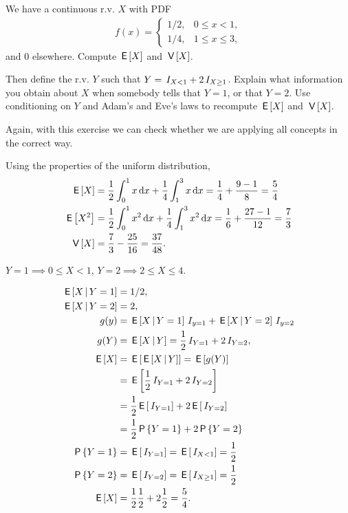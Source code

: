 \documentclass[lectures]{subfiles}
\begin{document}
\begin{exercise}
We have a continuous r.v. $X$ with PDF
\begin{align}
  \label{eq:1123}
  f(x) =
  \begin{cases}
    1/2, & 0\leq x < 1, \\
    1/4, & 1\leq x \leq 3,
  \end{cases}
\end{align}
and $0$ elsewhere. Compute $\,\mathsf{E}\left[X\right]$ and $\,\mathsf{V}\left[X\right]$.

Then define the r.v.
$Y$ such that $Y=\,I_{X< 1} + 2\,I_{X\geq 1}$.
Explain what information you obtain about $X$ when somebody tells that $Y=1$, or that $Y=2$.
Use conditioning on $Y$ and Adam's and Eve's laws to recompute $\,\mathsf{E}\left[X\right]$ and $\,\mathsf{V}\left[X\right]$.

Again, with this exercise we can check whether we are applying all concepts in the correct way.
\begin{solution}

Using the properties of the uniform distribution,
\begin{align}
\,\mathsf{E}\left[X\right] &= \frac{1}{2} \int_0^1 x \,\textrm{d}x + \frac{1}{4} \int_1^3 x \,\textrm{d}x = \frac{1}{4} + \frac{9-1}{8} = \frac{5}{4} \\
\,\mathsf{E}\left[X^2\right] &=  \frac{1}{2}\int_0^{1} x^{2}\,\textrm{d}x + \frac{1}{4}\int_1^{3} x^{2}\,\textrm{d}x = \frac{1}{6} + \frac{27-1}{12} = \frac{7}{3} \\
\,\mathsf{V}\left[X\right] &=  \frac{7}{3} - \frac{25}{16} = \frac{37}{48}.
\end{align}

$Y=1 \implies 0\leq X< 1$,  $Y=2 \implies 2\leq X \leq 4$.

\begin{align}
\,\mathsf{E}\left[X\,\middle|\, Y=1\right] &= 1/2, \\
\,\mathsf{E}\left[X\,\middle|\, Y=2\right] &= 2, \\
g(y) &= \,\mathsf{E}\left[X\,\middle|\, Y=1\right]\,I_{y=1} + \,\mathsf{E}\left[X\,\middle|\, Y=2\right]\,I_{y=2}\\
g(Y) &= \,\mathsf{E}\left[X \,\middle|\, Y\right] = \frac{1}{2} \,I_{Y=1} + 2 \,I_{Y=2},\\
\,\mathsf{E}\left[X\right] &= \,\mathsf{E}\left[\,\mathsf{E}\left[X\,\middle|\, Y\right]\right] = \,\mathsf{E}\left[g(Y)\right] \\
&=\,\mathsf{E}\left[\frac{1}{2} \,I_{Y=1} + 2 \,I_{Y=2}\right] \\
&= \frac{1}{2} \,\mathsf{E}\left[\,I_{Y=1}\right] + 2 \,\mathsf{E}\left[\,I_{Y=2}\right] \\
&= \frac{1}{2} \,\mathsf{P}\left\{Y=1\right\} + 2 \,\mathsf{P}\left\{Y=2\right\} \\
\,\mathsf{P}\left\{Y=1\right\} &= \,\mathsf{E}\left[\,I_{Y=1}\right] = \,\mathsf{E}\left[\,I_{X<1}\right] = \frac{1}{2} \\
\,\mathsf{P}\left\{Y=2\right\} &= \,\mathsf{E}\left[\,I_{Y=2}\right] = \,\mathsf{E}\left[\,I_{X\geq 1}\right] = \frac{1}{2} \\
\,\mathsf{E}\left[X\right] &= \frac{1}{2} \frac{1}{2} + 2 \frac{1}{2} = \frac{5}{4}.
\end{align}



\end{solution}
\end{exercise}
\end{document}
